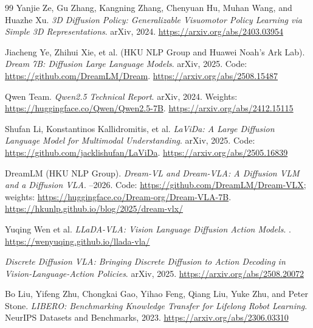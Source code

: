\documentclass[11pt]{article}
\begin{document}
\begin{thebibliography}{99}
Yanjie Ze, Gu Zhang, Kangning Zhang, Chenyuan Hu, Muhan Wang, and Huazhe Xu.
\newblock \textit{3D Diffusion Policy: Generalizable Visuomotor Policy Learning via Simple 3D Representations}.
\newblock arXiv, 2024.
\newblock \url{https://arxiv.org/abs/2403.03954}

Jiacheng Ye, Zhihui Xie, et al. (HKU NLP Group and Huawei Noah's Ark Lab).
\newblock \textit{Dream 7B: Diffusion Large Language Models}.
\newblock arXiv, 2025. Code: \url{https://github.com/DreamLM/Dream}.
\newblock \url{https://arxiv.org/abs/2508.15487}

Qwen Team.
\newblock \textit{Qwen2.5 Technical Report}.
\newblock arXiv, 2024. Weights: \url{https://huggingface.co/Qwen/Qwen2.5-7B}.
\newblock \url{https://arxiv.org/abs/2412.15115}

Shufan Li, Konstantinos Kallidromitis, et al.
\newblock \textit{LaViDa: A Large Diffusion Language Model for Multimodal Understanding}.
\newblock arXiv, 2025. Code: \url{https://github.com/jacklishufan/LaViDa}.
\newblock \url{https://arxiv.org/abs/2505.16839}

DreamLM (HKU NLP Group).
\newblock \textit{Dream-VL and Dream-VLA: A Diffusion VLM and a Diffusion VLA}.
--2026. Code: \url{https://github.com/DreamLM/Dream-VLX}; weights: \url{https://huggingface.co/Dream-org/Dream-VLA-7B}.
\newblock \url{https://hkunlp.github.io/blog/2025/dream-vlx/}

Yuqing Wen et al.
\newblock \textit{LLaDA-VLA: Vision Language Diffusion Action Models}.
.
\newblock \url{https://wenyuqing.github.io/llada-vla/}

\textit{Discrete Diffusion VLA: Bringing Discrete Diffusion to Action Decoding in Vision-Language-Action Policies}.
\newblock arXiv, 2025.
\newblock \url{https://arxiv.org/abs/2508.20072}

Bo Liu, Yifeng Zhu, Chongkai Gao, Yihao Feng, Qiang Liu, Yuke Zhu, and Peter Stone.
\newblock \textit{LIBERO: Benchmarking Knowledge Transfer for Lifelong Robot Learning}.
\newblock NeurIPS Datasets and Benchmarks, 2023.
\newblock \url{https://arxiv.org/abs/2306.03310}

\end{thebibliography}
\end{document}
